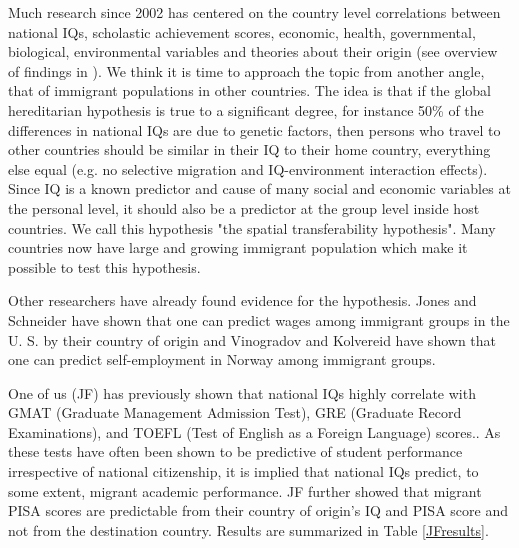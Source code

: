 \documentclass[a4paper,12pt]{article}
\begin{document}
Much research since 2002 has centered on the country level correlations between national IQs, scholastic achievement scores, economic, health, governmental, biological, environmental variables and theories about their origin (see overview of findings in \cite{lynn2012intelligence}). We think it is time to approach the topic from another angle, that of immigrant populations in other countries. The idea is that if the global hereditarian hypothesis is true to a significant degree, for instance 50\% of the differences in national IQs are due to genetic factors, then persons who travel to other countries should be similar in their IQ to their home country, everything else equal (e.g. no selective migration and IQ-environment interaction effects). Since IQ is a known predictor and cause of many social and economic variables at the personal level, it should also be a predictor at the group level inside host countries. We call this hypothesis "the spatial transferability hypothesis". Many countries now have large and growing immigrant population which make it possible to test this hypothesis.

Other researchers have already found evidence for the hypothesis. Jones and Schneider have shown that one can predict wages among immigrant groups in the U. S. by their country of origin\cite{jones2010iq} and Vinogradov and Kolvereid have shown that one can predict self-employment in Norway among immigrant groups\cite{vinogradov2010home}.

One of us (JF) has previously shown that national IQs highly correlate with GMAT (Graduate Management Admission Test), GRE (Graduate Record Examinations), and TOEFL (Test of English as a Foreign Language) scores.\cite{JFuerst1}. As these tests have often been shown to be predictive of student performance irrespective of national citizenship\cite{talento-miller2009validity}, it is implied that national IQs predict, to some extent, migrant academic performance. JF further showed that migrant PISA scores are predictable from their country of origin's IQ and PISA score and not from the destination country\cite{JFuerst2}. Results are summarized in Table \ref{JFresults}.
\end{document}
